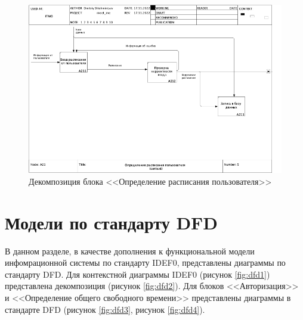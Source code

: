 \documentclass[14pt]{extreport}
\begin{document}
\begin{landscape}
\begin{figure}[h]
        \includegraphics[width=1\linewidth]{img/05_A21.png}
        \caption{ Декомпозиция блока <<Определение расписания пользователя>>}
        \label{fig:idef05}
    \end{figure}
    
\end{landscape}






\section{Модели по стандарту DFD}
В данном разделе, в качестве дополнения к функциональной модели инфомрационной системы по стандарту IDEF0, представлены диаграммы по стандарту DFD. Для контекстной диаграммы IDEF0 (рисунок \ref{fig:dfd1}) представлена декомпозиция (рисунок \ref{fig:dfd2}). Для блоков <<Авторизация>> и <<Определение общего свободного времени>> представлены диаграммы в стандарте DFD (рисунок \ref{fig:dfd3}, рисунок \ref{fig:dfd4}).
\end{document}
